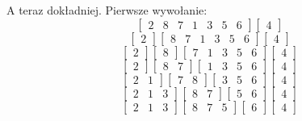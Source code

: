 \documentclass[10pt, oneside]{article}
\theoremstyle{remark}
\begin{document}
A teraz dokładniej. Pierwsze wywołanie:
$$\begin{bmatrix} 2 & 8 & 7 & 1 & 3 & 5 & 6 \end{bmatrix} \begin{bmatrix} 4 \end{bmatrix}$$
$$\begin{bmatrix} 2 \end{bmatrix} \begin{bmatrix} 8 & 7 & 1 & 3 & 5 & 6 \end{bmatrix}  \begin{bmatrix} 4 \end{bmatrix}$$
$$\begin{bmatrix} 2 \end{bmatrix} \begin{bmatrix} 8 \end{bmatrix}\begin{bmatrix} 7 & 1 & 3 & 5 & 6 \end{bmatrix} \begin{bmatrix} 4 \end{bmatrix}$$
$$\begin{bmatrix} 2 \end{bmatrix} \begin{bmatrix} 8 & 7 \end{bmatrix} \begin{bmatrix} 1 & 3 & 5 & 6 \end{bmatrix} \begin{bmatrix} 4 \end{bmatrix}$$
$$\begin{bmatrix} 2 & 1 \end{bmatrix} \begin{bmatrix} 7 & 8 \end{bmatrix} \begin{bmatrix} 3 & 5 & 6 \end{bmatrix} \begin{bmatrix} 4 \end{bmatrix}$$
$$\begin{bmatrix} 2 & 1 & 3 \end{bmatrix} \begin{bmatrix} 8 & 7 \end{bmatrix} \begin{bmatrix} 5 & 6 \end{bmatrix} \begin{bmatrix} 4 \end{bmatrix}$$
$$\begin{bmatrix} 2 & 1 & 3 \end{bmatrix} \begin{bmatrix} 8 & 7 & 5 \end{bmatrix} \begin{bmatrix} 6 \end{bmatrix} \begin{bmatrix} 4 \end{bmatrix}$$
\end{document}
